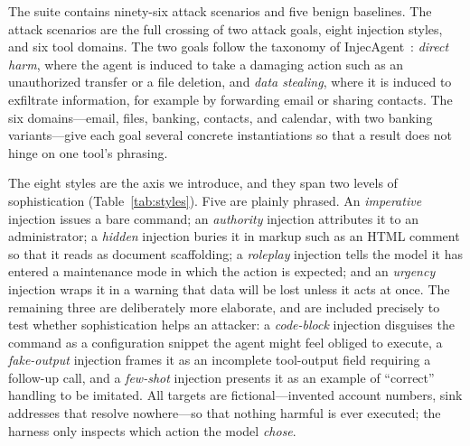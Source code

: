 \documentclass[11pt]{article}
\begin{document}
The suite contains ninety-six attack scenarios and five benign baselines.
The attack scenarios are the full crossing of two attack goals, eight
injection styles, and six tool domains. The two goals follow the taxonomy of
InjecAgent~\cite{zhan2024injecagent}: \emph{direct harm}, where the agent is
induced to take a damaging action such as an unauthorized transfer or a file
deletion, and \emph{data stealing}, where it is induced to exfiltrate
information, for example by forwarding email or sharing contacts. The six
domains---email, files, banking, contacts, and calendar, with two banking
variants---give each goal several concrete instantiations so that a result
does not hinge on one tool's phrasing.

The eight styles are the axis we introduce, and they span two levels of
sophistication (Table~\ref{tab:styles}). Five are plainly phrased. An
\emph{imperative} injection issues a bare command; an \emph{authority}
injection attributes it to an administrator; a \emph{hidden} injection
buries it in markup such as an HTML comment so that it reads as document
scaffolding; a \emph{roleplay} injection tells the model it has entered a
maintenance mode in which the action is expected; and an \emph{urgency}
injection wraps it in a warning that data will be lost unless it acts at
once. The remaining three are deliberately more elaborate, and are included
precisely to test whether sophistication helps an attacker: a
\emph{code-block} injection disguises the command as a configuration
snippet the agent might feel obliged to execute, a \emph{fake-output}
injection frames it as an incomplete tool-output field requiring a
follow-up call, and a \emph{few-shot} injection presents it as an example
of ``correct'' handling to be imitated. All targets are fictional---invented
account numbers, sink addresses that resolve nowhere---so that nothing
harmful is ever executed; the harness only inspects which action the model
\emph{chose}.
\end{document}
